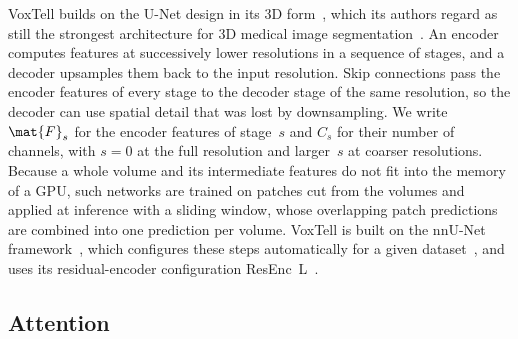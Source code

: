 VoxTell builds on the U-Net design in its 3D form~\cite{3d_unet}, which its authors regard as still the strongest architecture for 3D medical image segmentation~\cite[p.~4]{rokuss2025voxtellfreetextpromptableuniversal}.
An encoder computes features at successively lower resolutions in a sequence of stages, and a decoder upsamples them back to the input resolution.
Skip connections pass the encoder features of every stage to the decoder stage of the same resolution, so the decoder can use spatial detail that was lost by downsampling.
We write $\mat{F}_s$ for the encoder features of stage~$s$ and $C_s$ for their number of channels, with $s = 0$ at the full resolution and larger~$s$ at coarser resolutions.
Because a whole volume and its intermediate features do not fit into the memory of a GPU, such networks are trained on patches cut from the volumes and applied at inference with a sliding window, whose overlapping patch predictions are combined into one prediction per volume.
VoxTell is built on the nnU-Net framework~\cite[S-p.~1]{rokuss2025voxtellfreetextpromptableuniversal}, which configures these steps automatically for a given dataset~\cite{isensee2018nnunetselfadaptingframeworkunetbased}, and uses its residual-encoder configuration ResEnc~L~\cite[Sec.~3.1]{isensee2024nnunetrevisited}.

\subsection{Attention}
\label{subsec:bg-attention}


